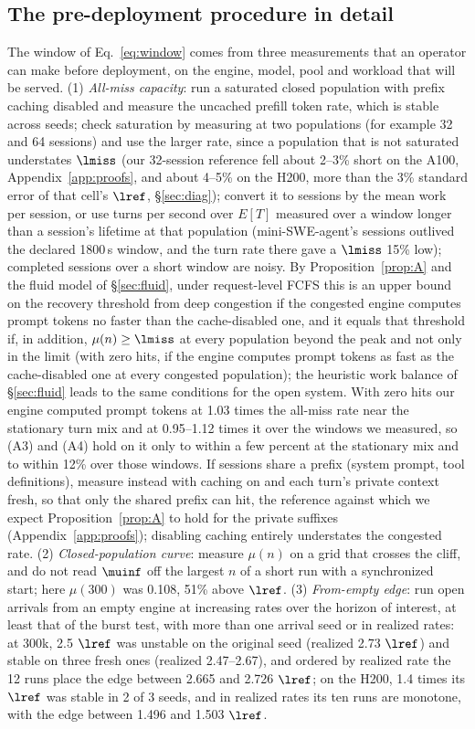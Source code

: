 \subsection{The pre-deployment procedure in detail}
The window of Eq.~\eqref{eq:window} comes from three measurements that an operator can make before deployment, on the engine, model, pool and workload that will be served. (1) \emph{All-miss capacity}: run a saturated closed population with prefix caching disabled and measure the uncached prefill token rate, which is stable across seeds; check saturation by measuring at two populations (for example 32 and 64 sessions) and use the larger rate, since a population that is not saturated understates $\lmiss$ (our 32-session reference fell about 2--3\% short on the A100, Appendix~\ref{app:proofs}, and about 4--5\% on the H200, more than the 3\% standard error of that cell's $\lref$, \S\ref{sec:diag}); convert it to sessions by the mean work per session, or use turns per second over $E[T]$ measured over a window longer than a session's lifetime at that population (mini-SWE-agent's sessions outlived the declared 1800\,s window, and the turn rate there gave a $\lmiss$ 15\% low); completed sessions over a short window are noisy. By Proposition~\ref{prop:A} and the fluid model of \S\ref{sec:fluid}, under request-level FCFS this is an upper bound on the recovery threshold from deep congestion if the congested engine computes prompt tokens no faster than the cache-disabled one, and it equals that threshold if, in addition, $\mu(n)\ge\lmiss$ at every population beyond the peak and not only in the limit (with zero hits, if the engine computes prompt tokens as fast as the cache-disabled one at every congested population); the heuristic work balance of \S\ref{sec:fluid} leads to the same conditions for the open system. With zero hits our engine computed prompt tokens at 1.03 times the all-miss rate near the stationary turn mix and at 0.95--1.12 times it over the windows we measured, so (A3) and (A4) hold on it only to within a few percent at the stationary mix and to within 12\% over those windows. If sessions share a prefix (system prompt, tool definitions), measure instead with caching on and each turn's private context fresh, so that only the shared prefix can hit, the reference against which we expect Proposition~\ref{prop:A} to hold for the private suffixes (Appendix~\ref{app:proofs}); disabling caching entirely understates the congested rate. (2) \emph{Closed-population curve}: measure $\mu(n)$ on a grid that crosses the cliff, and do not read $\muinf$ off the largest $n$ of a short run with a synchronized start; here $\mu(300)$ was 0.108\sps, 51\% above $\lref$. (3) \emph{From-empty edge}: run open arrivals from an empty engine at increasing rates over the horizon of interest, at least that of the burst test, with more than one arrival seed or in realized rates: at 300k, 2.5 $\lref$ was unstable on the original seed (realized 2.73 $\lref$) and stable on three fresh ones (realized 2.47--2.67), and ordered by realized rate the 12 runs place the edge between 2.665 and 2.726 $\lref$; on the H200, 1.4 times its $\lref$ was stable in 2 of 3 seeds, and in realized rates its ten runs are monotone, with the edge between 1.496 and 1.503 $\lref$.


